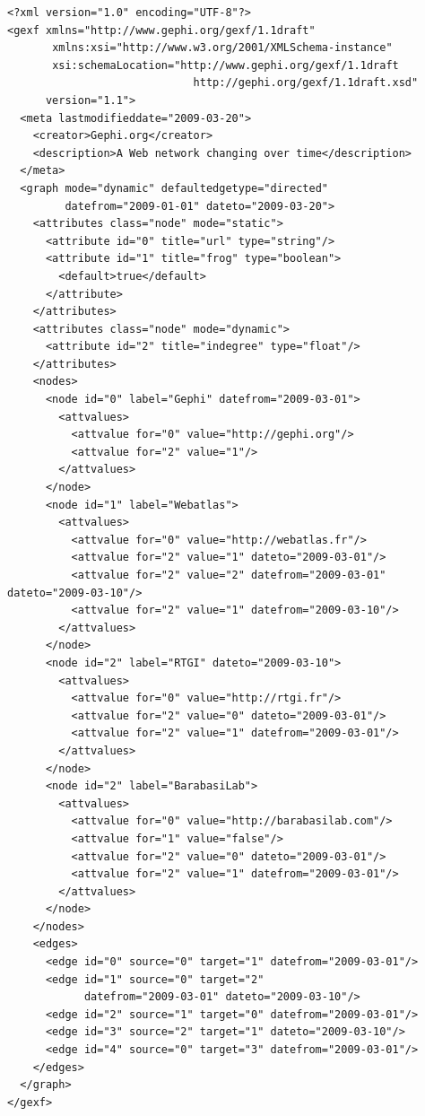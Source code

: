 \documentclass[a4paper,10pt]{article}
\begin{document}
\lstset{ style=gexf }
\begin{lstlisting}[caption={A (small) Dynamic Web Graph with continuous time},label=dynwebgraph]
<?xml version="1.0" encoding="UTF-8"?>
<gexf xmlns="http://www.gephi.org/gexf/1.1draft"
       xmlns:xsi="http://www.w3.org/2001/XMLSchema-instance"
       xsi:schemaLocation="http://www.gephi.org/gexf/1.1draft
                             http://gephi.org/gexf/1.1draft.xsd"
      version="1.1">
  <meta lastmodifieddate="2009-03-20">
    <creator>Gephi.org</creator>
    <description>A Web network changing over time</description>
  </meta>
  <graph mode="dynamic" defaultedgetype="directed"
         datefrom="2009-01-01" dateto="2009-03-20">
    <attributes class="node" mode="static">
      <attribute id="0" title="url" type="string"/>
      <attribute id="1" title="frog" type="boolean">
        <default>true</default>
      </attribute>
    </attributes>
    <attributes class="node" mode="dynamic">
      <attribute id="2" title="indegree" type="float"/>
    </attributes>
    <nodes>
      <node id="0" label="Gephi" datefrom="2009-03-01">
        <attvalues>
          <attvalue for="0" value="http://gephi.org"/>
          <attvalue for="2" value="1"/>
        </attvalues>
      </node>
      <node id="1" label="Webatlas">
        <attvalues>
          <attvalue for="0" value="http://webatlas.fr"/>
          <attvalue for="2" value="1" dateto="2009-03-01"/>
          <attvalue for="2" value="2" datefrom="2009-03-01" dateto="2009-03-10"/>
          <attvalue for="2" value="1" datefrom="2009-03-10"/>
        </attvalues>
      </node>
      <node id="2" label="RTGI" dateto="2009-03-10">
        <attvalues>
          <attvalue for="0" value="http://rtgi.fr"/>
          <attvalue for="2" value="0" dateto="2009-03-01"/>
          <attvalue for="2" value="1" datefrom="2009-03-01"/>
        </attvalues>
      </node>
      <node id="2" label="BarabasiLab">
        <attvalues>
          <attvalue for="0" value="http://barabasilab.com"/>
          <attvalue for="1" value="false"/>
          <attvalue for="2" value="0" dateto="2009-03-01"/>
          <attvalue for="2" value="1" datefrom="2009-03-01"/>
        </attvalues>
      </node>
    </nodes>
    <edges>
      <edge id="0" source="0" target="1" datefrom="2009-03-01"/>
      <edge id="1" source="0" target="2"
            datefrom="2009-03-01" dateto="2009-03-10"/>
      <edge id="2" source="1" target="0" datefrom="2009-03-01"/>
      <edge id="3" source="2" target="1" dateto="2009-03-10"/>
      <edge id="4" source="0" target="3" datefrom="2009-03-01"/>
    </edges>
  </graph>
</gexf>
\end{lstlisting}
\end{document}
